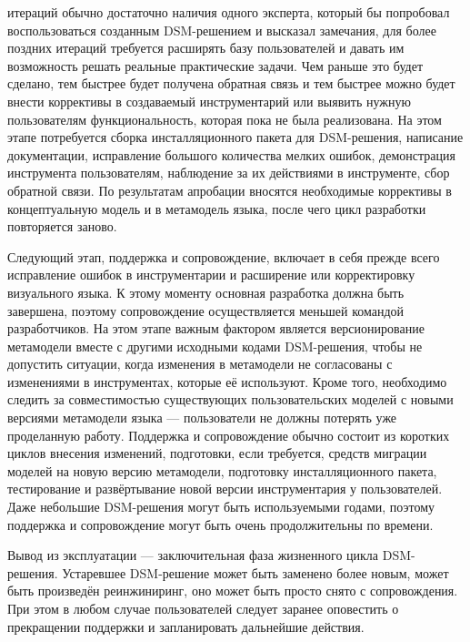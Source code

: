 \begin{enumerate}
		итераций обычно достаточно наличия одного эксперта, который бы попробовал воспользоваться 
		созданным DSM-решением и высказал замечания, для более поздних итераций требуется 
		расширять базу пользователей и давать им возможность решать реальные практические задачи. 
		Чем раньше это будет сделано, тем быстрее будет получена обратная связь и тем 
		быстрее можно будет внести коррективы в создаваемый инструментарий или выявить 
		нужную пользователям функциональность, которая пока не была реализована. На этом 
		этапе потребуется сборка инсталляционного пакета для DSM-решения, написание документации, 
		исправление большого количества мелких ошибок, демонстрация инструмента пользователям, 
		наблюдение за их действиями в инструменте, сбор обратной связи. По результатам 
		апробации вносятся необходимые коррективы в концептуальную модель и в метамодель 
		языка, после чего цикл разработки повторяется заново.
\end{enumerate}

Следующий этап, поддержка и сопровождение, включает в себя прежде всего исправление 
ошибок в инструментарии и расширение или корректировку визуального языка. К этому 
моменту основная разработка должна быть завершена, поэтому сопровождение осуществляется 
меньшей командой разработчиков. На этом этапе важным фактором является версионирование 
метамодели вместе с другими исходными кодами DSM-решения, чтобы не допустить ситуации, 
когда изменения в метамодели не согласованы с изменениями в инструментах, которые её 
используют. Кроме того, необходимо следить за совместимостью существующих пользовательских 
моделей с новыми версиями метамодели языка --- пользователи не должны потерять уже 
проделанную работу. Поддержка и сопровождение обычно состоит из коротких циклов внесения 
изменений, подготовки, если требуется, средств миграции моделей на новую версию метамодели, 
подготовку инсталляционного пакета, тестирование и развёртывание новой версии инструментария 
у пользователей. Даже небольшие DSM-решения могут быть используемыми годами, поэтому 
поддержка и сопровождение могут быть очень продолжительны по времени.

Вывод из эксплуатации --- заключительная фаза жизненного цикла DSM-решения. Устаревшее 
DSM-решение может быть заменено более новым, может быть произведён реинжиниринг, оно 
может быть просто снято с сопровождения. При этом в любом случае пользователей следует 
заранее оповестить о прекращении поддержки и запланировать дальнейшие действия.

